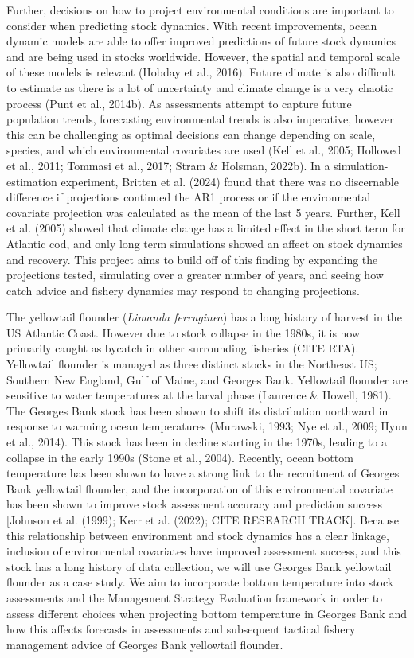 \documentclass[
  12pt,
]{article}
\begin{document}
Further, decisions on how to project environmental conditions are important to consider when predicting stock dynamics. With recent improvements, ocean dynamic models are able to offer improved predictions of future stock dynamics and are being used in stocks worldwide. However, the spatial and temporal scale of these models is relevant (Hobday et al., 2016). Future climate is also difficult to estimate as there is a lot of uncertainty and climate change is a very chaotic process (Punt et al., 2014b). As assessments attempt to capture future population trends, forecasting environmental trends is also imperative, however this can be challenging as optimal decisions can change depending on scale, species, and which environmental covariates are used (Kell et al., 2005; Hollowed et al., 2011; Tommasi et al., 2017; Stram \& Holsman, 2022b). In a simulation-estimation experiment, Britten et al. (2024) found that there was no discernable difference if projections continued the AR1 process or if the environmental covariate projection was calculated as the mean of the last 5 years. Further, Kell et al. (2005) showed that climate change has a limited effect in the short term for Atlantic cod, and only long term simulations showed an affect on stock dynamics and recovery. This project aims to build off of this finding by expanding the projections tested, simulating over a greater number of years, and seeing how catch advice and fishery dynamics may respond to changing projections.

The yellowtail flounder (\emph{Limanda ferruginea}) has a long history of harvest in the US Atlantic Coast. However due to stock collapse in the 1980s, it is now primarily caught as bycatch in other surrounding fisheries (CITE RTA). Yellowtail flounder is managed as three distinct stocks in the Northeast US; Southern New England, Gulf of Maine, and Georges Bank. Yellowtail flounder are sensitive to water temperatures at the larval phase (Laurence \& Howell, 1981). The Georges Bank stock has been shown to shift its distribution northward in response to warming ocean temperatures (Murawski, 1993; Nye et al., 2009; Hyun et al., 2014). This stock has been in decline starting in the 1970s, leading to a collapse in the early 1990s (Stone et al., 2004). Recently, ocean bottom temperature has been shown to have a strong link to the recruitment of Georges Bank yellowtail flounder, and the incorporation of this environmental covariate has been shown to improve stock assessment accuracy and prediction success {[}Johnson et al. (1999); Kerr et al. (2022); CITE RESEARCH TRACK{]}. Because this relationship between environment and stock dynamics has a clear linkage, inclusion of environmental covariates have improved assessment success, and this stock has a long history of data collection, we will use Georges Bank yellowtail flounder as a case study. We aim to incorporate bottom temperature into stock assessments and the Management Strategy Evaluation framework in order to assess different choices when projecting bottom temperature in Georges Bank and how this affects forecasts in assessments and subsequent tactical fishery management advice of Georges Bank yellowtail flounder.
\end{document}
